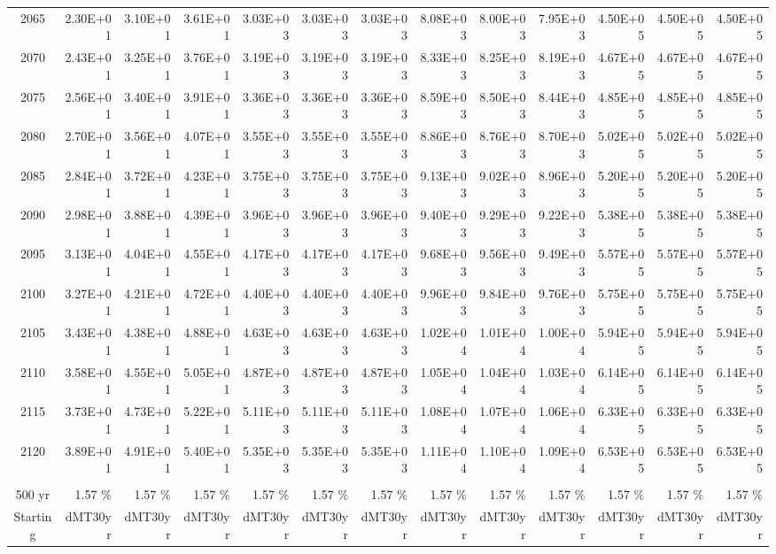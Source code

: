 \documentclass{article}
\begin{document}
\begin{table}
\begin{tabular}{crrr|rrr|rrr|rrr}
2065     & 2.30E+01 & 3.10E+01 & 3.61E+01 & 3.03E+03 & 3.03E+03 & 3.03E+03 & 8.08E+03 & 8.00E+03 & 7.95E+03 & 4.50E+05 & 4.50E+05 & 4.50E+05 \\
2070     & 2.43E+01 & 3.25E+01 & 3.76E+01 & 3.19E+03 & 3.19E+03 & 3.19E+03 & 8.33E+03 & 8.25E+03 & 8.19E+03 & 4.67E+05 & 4.67E+05 & 4.67E+05 \\
2075     & 2.56E+01 & 3.40E+01 & 3.91E+01 & 3.36E+03 & 3.36E+03 & 3.36E+03 & 8.59E+03 & 8.50E+03 & 8.44E+03 & 4.85E+05 & 4.85E+05 & 4.85E+05 \\
2080     & 2.70E+01 & 3.56E+01 & 4.07E+01 & 3.55E+03 & 3.55E+03 & 3.55E+03 & 8.86E+03 & 8.76E+03 & 8.70E+03 & 5.02E+05 & 5.02E+05 & 5.02E+05 \\
2085     & 2.84E+01 & 3.72E+01 & 4.23E+01 & 3.75E+03 & 3.75E+03 & 3.75E+03 & 9.13E+03 & 9.02E+03 & 8.96E+03 & 5.20E+05 & 5.20E+05 & 5.20E+05 \\
2090     & 2.98E+01 & 3.88E+01 & 4.39E+01 & 3.96E+03 & 3.96E+03 & 3.96E+03 & 9.40E+03 & 9.29E+03 & 9.22E+03 & 5.38E+05 & 5.38E+05 & 5.38E+05 \\
2095     & 3.13E+01 & 4.04E+01 & 4.55E+01 & 4.17E+03 & 4.17E+03 & 4.17E+03 & 9.68E+03 & 9.56E+03 & 9.49E+03 & 5.57E+05 & 5.57E+05 & 5.57E+05 \\
2100     & 3.27E+01 & 4.21E+01 & 4.72E+01 & 4.40E+03 & 4.40E+03 & 4.40E+03 & 9.96E+03 & 9.84E+03 & 9.76E+03 & 5.75E+05 & 5.75E+05 & 5.75E+05 \\
2105     & 3.43E+01 & 4.38E+01 & 4.88E+01 & 4.63E+03 & 4.63E+03 & 4.63E+03 & 1.02E+04 & 1.01E+04 & 1.00E+04 & 5.94E+05 & 5.94E+05 & 5.94E+05 \\
2110     & 3.58E+01 & 4.55E+01 & 5.05E+01 & 4.87E+03 & 4.87E+03 & 4.87E+03 & 1.05E+04 & 1.04E+04 & 1.03E+04 & 6.14E+05 & 6.14E+05 & 6.14E+05 \\
2115     & 3.73E+01 & 4.73E+01 & 5.22E+01 & 5.11E+03 & 5.11E+03 & 5.11E+03 & 1.08E+04 & 1.07E+04 & 1.06E+04 & 6.33E+05 & 6.33E+05 & 6.33E+05 \\
2120     & 3.89E+01 & 4.91E+01 & 5.40E+01 & 5.35E+03 & 5.35E+03 & 5.35E+03 & 1.11E+04 & 1.10E+04 & 1.09E+04 & 6.53E+05 & 6.53E+05 & 6.53E+05 \\
         &          &          &          &          &          &          &          &          &          &          &          &          \\ \hline
500 yr   & 1.57 \%  & 1.57 \%  & 1.57 \%  & 1.57 \%  & 1.57 \%  & 1.57 \%  & 1.57 \%  & 1.57 \%  & 1.57 \%  & 1.57 \%  & 1.57 \%  & 1.57 \%  \\
Starting & dMT30yr  & dMT30yr  & dMT30yr  & dMT30yr  & dMT30yr  & dMT30yr  & dMT30yr  & dMT30yr  & dMT30yr  & dMT30yr  & dMT30yr  & dMT30yr  \\

\end{tabular}
\end{table}
\end{document}
